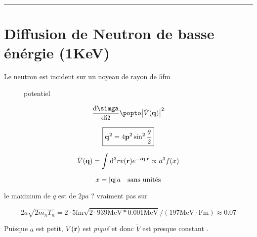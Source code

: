 \hrule

\section*{Diffusion de Neutron de basse énérgie (1KeV)}

Le neutron est incident sur un noyeau de rayon de $5$fm 


\begin{figure}[ht]
    \centering
    \caption{potentiel}
    \label{fig:potenteil}
\end{figure}


$$\dv{\simga}{\Omega} \popto \abs{\tilde V(\vb{q})}^{2}$$ 

$$\boxed{\vb{q}^2 = 4 \vb{p}^2 \sin^{2}\frac{\theta}{2} }$$ 


$$\tilde V(\vb{q}) = \int \dd^{3}r v(\vb{r}) e^{-i \vb{q}\cdot \vb{r}} \propto a^{3}f(x)$$ 


$$x = \abs{\vb{q}}a \quad \text{sans unités} $$ 

le maximum de $q$ est de $2pa$ ? vraiment pas sur

$$2a \sqrt{2 m_n T_{n}} = 2 \cdot 5 \text{fm} \sqrt{2 \cdot 939 \text{MeV} * 0.001 \text{MeV} }/(197 \text{MeV}\cdot \text{Fm}  ) \approx 0.07 $$  

Puisque $a$ est petit, $V(\vb{r})$ est \textit{piqué} et donc $\tilde V$ est presque constant .   



